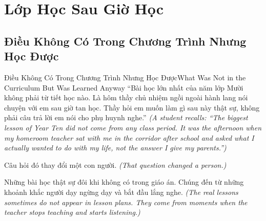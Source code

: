 
\chapter{Lớp Học Sau Giờ Học}

\section{Điều Không Có Trong Chương Trình Nhưng Học Được}
\begin{truyen}{Điều Không Có Trong Chương Trình Nhưng Học Được}{What Was Not in the Curriculum But Was Learned Anyway}
 ``Bài học lớn nhất của năm lớp Mười không phải từ tiết học nào. Là hôm thầy chủ nhiệm ngồi ngoài hành lang nói chuyện với em sau giờ tan học. Thầy hỏi em muốn làm gì sau này thật sự, không phải câu trả lời em nói cho phụ huynh nghe.''
\textit{(A student recalls: ``The biggest lesson of Year Ten did not come from any class period. It was the afternoon when my homeroom teacher sat with me in the corridor after school and asked what I actually wanted to do with my life, not the answer I give my parents.'')}

Câu hỏi đó thay đổi một con người.
\textit{(That question changed a person.)}

\begin{baihoc}
Những bài học thật sự đôi khi không có trong giáo án. Chúng đến từ những khoảnh khắc người dạy ngừng dạy và bắt đầu lắng nghe.
\textit{(The real lessons sometimes do not appear in lesson plans. They come from moments when the teacher stops teaching and starts listening.)}
\end{baihoc}
\end{truyen}

